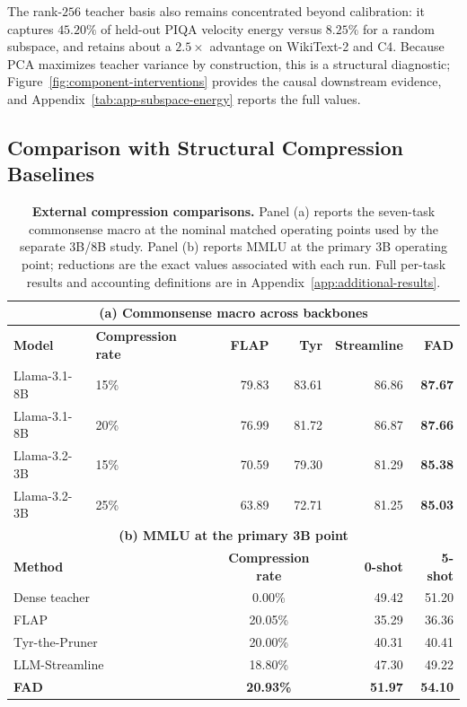 \documentclass{article}
\theoremstyle{plain}
\theoremstyle{definition}
\theoremstyle{remark}
\begin{document}
The rank-$256$ teacher basis also remains concentrated beyond calibration: it
captures $45.20\%$ of held-out PIQA velocity energy versus $8.25\%$ for a random
subspace, and retains about a $2.5\times$ advantage on WikiText-2 and C4.  Because
PCA maximizes teacher variance by construction, this is a structural diagnostic;
Figure~\ref{fig:component-interventions} provides the causal downstream evidence,
and Appendix~\ref{tab:app-subspace-energy} reports the full values.

\subsection{Comparison with Structural Compression Baselines}
\label{sec:external-results}

\begin{table}[!t]
\caption{\textbf{External compression comparisons.}  Panel (a) reports the
seven-task commonsense macro at the nominal matched operating points used by the
separate 3B/8B study.  Panel (b) reports MMLU at the primary 3B operating point;
reductions are the exact values associated with each run.  Full per-task results
and accounting definitions are in Appendix~\ref{app:additional-results}.}
\label{tab:external-main}
\centering
\footnotesize
\renewcommand{\arraystretch}{1.02}
\setlength{\tabcolsep}{5.2pt}
\begin{tabular}{@{}llrrrr@{}}
\toprule
\multicolumn{6}{c}{\textbf{(a) Commonsense macro across backbones}}\\
\midrule
\textbf{Model} & \textbf{Compression rate} & \textbf{FLAP}
& \textbf{Tyr} & \textbf{Streamline} & \textbf{FAD}\\
\midrule
Llama-3.1-8B & 15\% & 79.83 & 83.61 & 86.86 & \textbf{87.67}\\
Llama-3.1-8B & 20\% & 76.99 & 81.72 & 86.87 & \textbf{87.66}\\
Llama-3.2-3B & 15\% & 70.59 & 79.30 & 81.29 & \textbf{85.38}\\
Llama-3.2-3B & 25\% & 63.89 & 72.71 & 81.25 & \textbf{85.03}\\
\midrule
\multicolumn{6}{c}{\textbf{(b) MMLU at the primary 3B point}}\\
\midrule
\multicolumn{2}{l}{\textbf{Method}} & \multicolumn{2}{c}{\textbf{Compression rate}}
& \textbf{0-shot} & \textbf{5-shot}\\
\midrule
\multicolumn{2}{l}{Dense teacher} & \multicolumn{2}{c}{0.00\%} & 49.42 & 51.20\\
\multicolumn{2}{l}{FLAP} & \multicolumn{2}{c}{20.05\%} & 35.29 & 36.36\\
\multicolumn{2}{l}{Tyr-the-Pruner} & \multicolumn{2}{c}{20.00\%} & 40.31 & 40.41\\
\multicolumn{2}{l}{LLM-Streamline} & \multicolumn{2}{c}{18.80\%} & 47.30 & 49.22\\
\multicolumn{2}{l}{\textbf{FAD}} & \multicolumn{2}{c}{\textbf{20.93\%}}
& \textbf{51.97} & \textbf{54.10}\\
\bottomrule
\end{tabular}
\end{table}
\end{document}
